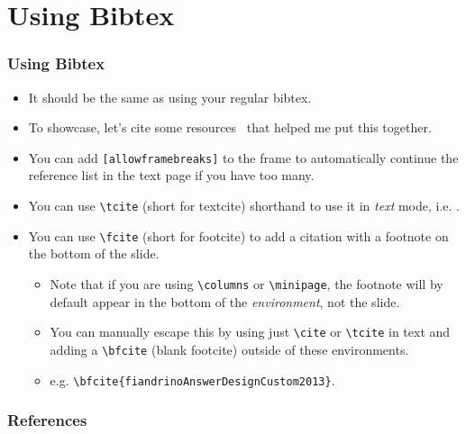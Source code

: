 \documentclass[
	10pt, %
	aspectratio=169, %
]{beamer}
\begin{document}
\section{Using Bibtex}
\begin{frame}
	\frametitle{Using Bibtex}
	\begin{itemize}
		\item It should be the same as using your regular bibtex.
		\item To showcase, let's cite some resources~\cite{anglimAnswerImageFull2010,fiandrinoAnswerDesignCustom2013,kormyloAnswerMakeTikz2017} that helped me put this together.
		\item You can add \texttt{[allowframebreaks]} to the frame to automatically continue the reference list in the text page if you have too many.
		\item You can use \texttt{\textbackslash tcite} (short for textcite) shorthand to use it in \textit{text} mode, i.e. .
		\item You can use \texttt{\textbackslash fcite} (short for footcite) to add a citation with a footnote on the bottom of the slide.
		      \begin{itemize}
			      \item Note that if you are using \texttt{\textbackslash columns} or \texttt{\textbackslash minipage}, the footnote will by default appear in the bottom of the \textit{environment}, not the slide.
			      \item You can manually escape this by using just \texttt{\textbackslash cite} or \texttt{\textbackslash tcite} in text and adding a \texttt{\textbackslash bfcite} (blank footcite) outside of these environments.
			      \item e.g. \texttt{\textbackslash bfcite\{fiandrinoAnswerDesignCustom2013\}}.
		      \end{itemize}
	\end{itemize}
\end{frame}

\begin{frame}[allowframebreaks]
	\frametitle{References}
	\printbibliography
\end{frame}
\end{document}
